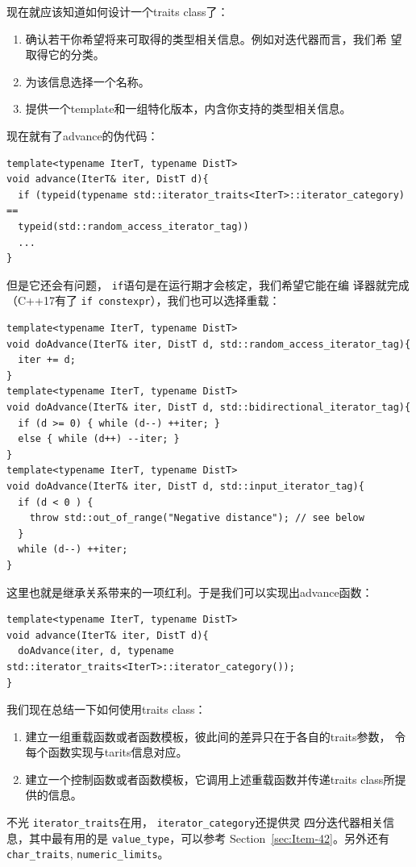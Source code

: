\documentclass[a4paper,twoside]{article}
\theoremstyle{definition}
\theoremstyle{remark}
\numberwithin{equation}{section}
\let\OldTexttt\texttt
\renewcommand{\texttt}[1]{{\color{blue} \OldTexttt{#1}}}
\begin{document}
现在就应该知道如何设计一个traits class了：
\begin{enumerate}
\item 确认若干你希望将来可取得的类型相关信息。例如对迭代器而言，我们希
  望取得它的分类。
\item 为该信息选择一个名称。
\item 提供一个template和一组特化版本，内含你支持的类型相关信息。
\end{enumerate}

现在就有了advance的伪代码：
\begin{verbatim}
template<typename IterT, typename DistT>
void advance(IterT& iter, DistT d){
  if (typeid(typename std::iterator_traits<IterT>::iterator_category) ==
  typeid(std::random_access_iterator_tag))
  ...
}
\end{verbatim}

但是它还会有问题，\texttt{if}语句是在运行期才会核定，我们希望它能在编
译器就完成（C++17有了\texttt{if constexpr}），我们也可以选择重载：
\begin{verbatim}
template<typename IterT, typename DistT> 
void doAdvance(IterT& iter, DistT d, std::random_access_iterator_tag){
  iter += d;
}
template<typename IterT, typename DistT>
void doAdvance(IterT& iter, DistT d, std::bidirectional_iterator_tag){
  if (d >= 0) { while (d--) ++iter; }
  else { while (d++) --iter; }
}
template<typename IterT, typename DistT>
void doAdvance(IterT& iter, DistT d, std::input_iterator_tag){
  if (d < 0 ) {
    throw std::out_of_range("Negative distance"); // see below
  }
  while (d--) ++iter;
}
\end{verbatim}
这里也就是继承关系带来的一项红利。于是我们可以实现出advance函数：
\begin{verbatim}
template<typename IterT, typename DistT>
void advance(IterT& iter, DistT d){
  doAdvance(iter, d, typename  std::iterator_traits<IterT>::iterator_category());
}
\end{verbatim}

我们现在总结一下如何使用traits class：
\begin{enumerate}
\item 建立一组重载函数或者函数模板，彼此间的差异只在于各自的traits参数，
  令每个函数实现与tarits信息对应。
\item 建立一个控制函数或者函数模板，它调用上述重载函数并传递traits
  class所提供的信息。
\end{enumerate}

不光\texttt{iterator\_traits}在用，\texttt{iterator\_category}还提供灵
四分迭代器相关信息，其中最有用的是\texttt{value\_type}，可以参考
Section~\ref{sec:Item-42}。另外还有\texttt{char\_traits},
\texttt{numeric\_limits}。
\end{document}
